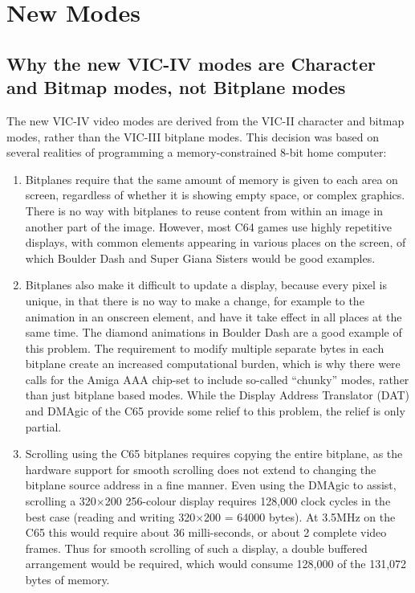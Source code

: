 \section{New Modes}

\subsection{Why the new VIC-IV modes are Character and Bitmap modes, not Bitplane modes}

The new VIC-IV video modes are derived from the VIC-II character and bitmap modes, rather than the VIC-III
bitplane modes. This decision was based on several realities of programming a memory-constrained 8-bit home computer:

\begin{enumerate}
\item Bitplanes require that the same amount of memory is given to each area on screen, regardless of whether it
is showing empty space, or complex graphics. There is no way with bitplanes to reuse content from within an image in
another part of the image.  However, most C64 games use highly repetitive displays, with common elements appearing in various
places on the screen, of which Boulder Dash and Super Giana Sisters would be good examples.

\item Bitplanes also make it difficult to update a display, because every pixel is unique, in that there is no way to make a change,
for example to the animation in an onscreen element, and have it take effect in all places at the same time. The diamond
animations in Boulder Dash are a good example of this problem.  The requirement to modify multiple separate bytes in each
bitplane create an increased computational burden, which is why there were calls for the Amiga AAA chip-set to include so-called
``chunky'' modes, rather than just bitplane based modes.  While the Display Address Translator (DAT) and DMAgic of the C65 provide some
relief to this problem, the relief is only partial.

\item Scrolling using the C65 bitplanes requires copying the entire bitplane, as the hardware support for smooth scrolling does not
extend to changing the bitplane source address in a fine manner.  Even using the DMAgic to assist, scrolling a 320$\times$200 256-colour
display requires 128,000 clock cycles in the best case (reading and writing 320$\times$200 = 64000 bytes). At 3.5MHz on the C65 this
would require about 36 milli-seconds, or about 2 complete video frames.  Thus for smooth scrolling of such a display, a double
buffered arrangement would be required, which would consume 128,000 of the 131,072 bytes of memory.


\end{enumerate}
